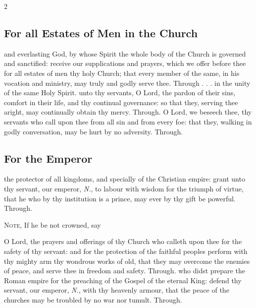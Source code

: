 \begin{multicols}{2}
\subsection{For all Estates of Men in the Church}
\collect
{} and everlasting God, by whose Spirit the whole body of the Church is governed and sanctified: receive our supplications and prayers, which we offer before thee for all estates of men thy holy Church; that every member of the same, in his vocation and ministry, may truly and godly serve thee. Through . . . in the unity of the same Holy Spirit.
\secret
{} unto thy servants, O Lord, the pardon of their sins, comfort in their life, and thy continual governance: so that they, serving thee aright, may continually obtain thy mercy. Through.
\postcommunion
{} O Lord, we beseech thee, thy servants who call upon thee from all sin and from every foe: that they, walking in godly conversation, may be hurt by no adversity. Through.


   \newcolumn

\subsection{For the Emperor}
\collect
{} the protector of all kingdoms, and specially of the Christian empire: grant unto thy servant, our emperor, \textit{N.}, to labour with wisdom for the triumph of virtue, that he who by thy institution is a prince, may ever by thy gift be powerful. Through.
\begin{rubric}
    \textsc{Note,} If he be not crowned, say 
\end{rubric}

\secret
{} O Lord, the prayers and offerings of thy Church who calleth upon thee for the safety of thy servant: and for the protection of the faithful peoples perform with thy mighty arm thy wondrous works of old, that they may overcome the enemies of peace, and serve thee in freedom and safety. Through.
\postcommunion
{} who didst prepare the Roman empire for the preaching of the Gospel of the eternal King: defend thy servant, our emperor, \textit{N.}, with thy heavenly armour, that the peace of the churches may be troubled by no war nor tumult. Through.

   \newcolumn


\end{multicols}
